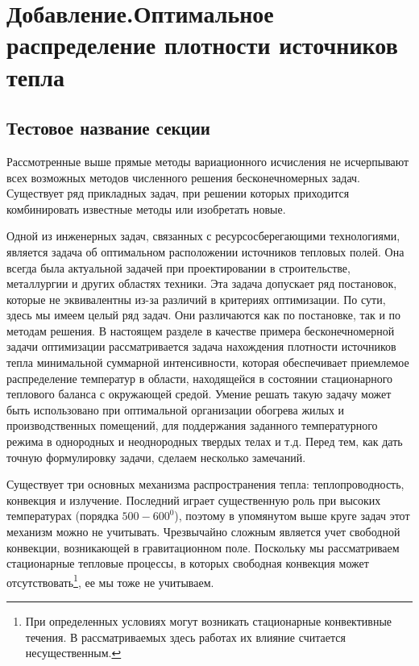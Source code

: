 \section*{ \sloppy \center Добавление.Оптимальное распределение плотности источников тепла }
\sloppy
\emergencystretch=20pt
\setcounter{section}{5} %
\setcounter{subsection}{0}
\setcounter{equation}{0}
\renewcommand{\thesubsection}{\Asbuk{section}.\arabic{subsection}}
\renewcommand{\theequation}{\Asbuk{section}.\arabic{equation}}
\subsection{Тестовое название секции}
 Рассмотренные выше прямые методы вариационного исчисления не исчерпывают всех возможных методов численного решения бесконечномерных задач.
Существует ряд прикладных задач, при решении которых приходится комбинировать известные методы или изобретать новые.

Одной из инженерных задач, связанных с ресурсосберегающими технологиями, является задача об оптимальном расположении источников тепловых полей. Она всегда была актуальной задачей при проектировании в строительстве, металлургии и других областях техники. Эта задача допускает ряд постановок, которые не эквивалентны из-за различий в критериях оптимизации. По сути, здесь мы имеем целый ряд задач. Они различаются как по постановке, так и по методам решения. В настоящем разделе в качестве примера бесконечномерной задачи оптимизации рассматривается задача нахождения плотности источников тепла минимальной суммарной интенсивности, которая обеспечивает приемлемое распределение температур в области, находящейся в состоянии стационарного теплового баланса с окружающей средой. Умение решать такую задачу может быть использовано при оптимальной организации обогрева жилых и производственных помещений, для поддержания заданного температурного режима в однородных и неоднородных твердых телах и т.д. Перед тем, как дать точную формулировку задачи, сделаем несколько замечаний.

Существует три основных механизма распространения тепла: теплопроводность, конвекция и излучение. Последний играет существенную роль при высоких температурах (порядка $500-600^0 $), поэтому в упомянутом выше круге задач этот механизм можно не учитывать. Чрезвычайно сложным является учет свободной конвекции, возникающей в гравитационном поле. Поскольку мы рассматриваем стационарные тепловые процессы, в которых свободная конвекция может
 отсутствовать\footnote{  При определенных условиях могут возникать стационарные конвективные течения. В рассматриваемых здесь работах их влияние считается несущественным.}, ее мы тоже не учитываем.

